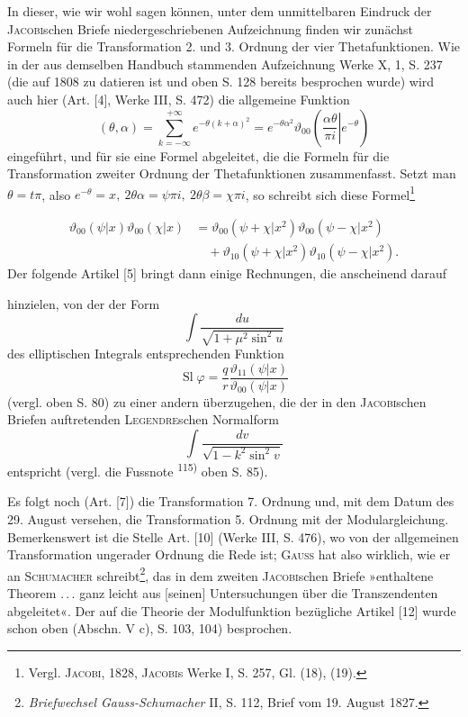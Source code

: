 In dieser, wie wir wohl sagen können, unter dem unmittelbaren Eindruck
der \textsc{Jacobi}schen Briefe niedergeschriebenen Aufzeichnung finden wir zunächst
Formeln für die Transformation 2. und 3. Ordnung der vier Thetafunktionen.
Wie in der aus demselben Handbuch stammenden Aufzeichnung Werke
X, 1, S. 237 (die auf 1808 zu datieren ist und oben S. 128 bereits besprochen
wurde) wird auch hier (Art. [4], Werke III, S. 472) die allgemeine
Funktion
\[
(\theta,\alpha)=\sum_{k=-\infty}^{+\infty}e^{-\theta(k+\alpha)^2}
=e^{-\theta\alpha^2}\vartheta_{00}\left(\left.\frac{\alpha\theta}{\pi i}\right|e^{-\theta}\right)
\]
\noindent eingeführt, und für sie eine Formel abgeleitet, die die Formeln für die Transformation
zweiter Ordnung der Thetafunktionen zusammenfasst. Setzt man
\(\theta=t\pi\), also \(e^{-\theta}=x,\ 2\theta\alpha=\psi\pi i,\ 2\theta\beta=\chi\pi i\), so schreibt sich diese Formel\begingroup\renewcommand{\thefootnote}{285a)}\footnote{Vergl. \textsc{Jacobi}, 1828, \textsc{Jacobi}s Werke I, S. 257, Gl. (18), (19).}\addtocounter{footnote}{-1}\endgroup
\[
\begin{aligned}
\vartheta_{00}(\psi|x)\vartheta_{00}(\chi|x)
&=\vartheta_{00}(\psi+\chi|x^2)\vartheta_{00}(\psi-\chi|x^2)\\
&\quad+\vartheta_{10}(\psi+\chi|x^2)\vartheta_{10}(\psi-\chi|x^2).
\end{aligned}
\]
\noindent Der folgende Artikel [5] bringt dann einige Rechnungen, die anscheinend darauf
\par\clearpage{}
\noindent hinzielen, von der der Form
\[
\int\frac{du}{\sqrt{1+\mu^2\sin^2u}}
\]
\noindent des elliptischen Integrals entsprechenden Funktion
\[
\operatorname{Sl}\varphi=\frac{q}{r}\frac{\vartheta_{11}(\psi|x)}{\vartheta_{00}(\psi|x)}
\]
\noindent (vergl. oben S. 80) zu einer andern überzugehen, die der in den \textsc{Jacobi}schen
Briefen auftretenden \textsc{Legendre}schen Normalform
\[
\int\frac{dv}{\sqrt{1-k^2\sin^2v}}
\]
\noindent entspricht (vergl. die Fussnote \textsuperscript{115)} oben S. 85).

Es folgt noch (Art. [7]) die Transformation 7. Ordnung und, mit dem
Datum des 29. August versehen, die Transformation 5. Ordnung mit der Modulargleichung.
Bemerkenswert ist die Stelle Art. [10] (Werke III, S. 476),
wo von der allgemeinen Transformation ungerader Ordnung die Rede ist;
\textsc{Gauss} hat also wirklich, wie er an \textsc{Schumacher} schreibt\footnote{\textit{Briefwechsel Gauss-Schumacher} II, S. 112, Brief vom 19. August 1827.}, das in dem zweiten
\textsc{Jacobi}schen Briefe »enthaltene Theorem \mbox{.\,.\,.} ganz leicht aus [seinen] Untersuchungen
über die Transzendenten abgeleitet«. Der auf die Theorie der
Modulfunktion bezügliche Artikel [12] wurde schon oben (Abschn. V c), S. 103,
104) besprochen.

